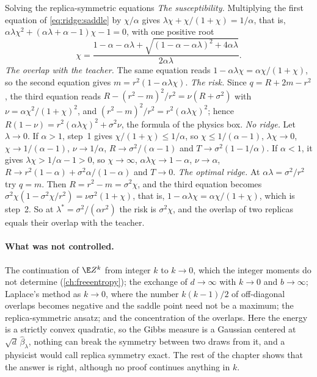 \begin{refsection}
\begin{computation}{Solving the replica-symmetric equations}\label{comp:ridge:saddle}
\step \emph{The susceptibility.} Multiplying the first equation of \eqref{eq:ridge:saddle} by $\chi/\alpha$ gives $\lambda\chi+\chi/(1+\chi)=1/\alpha$, that is, $\alpha\lambda\chi^2+(\alpha\lambda+\alpha-1)\chi-1=0$, with one positive root
\[
\chi=\frac{1-\alpha-\alpha\lambda+\sqrt{(1-\alpha-\alpha\lambda)^2+4\alpha\lambda}}{2\alpha\lambda}.
\]
\step \emph{The overlap with the teacher.} The same equation reads $1-\alpha\lambda\chi=\alpha\chi/(1+\chi)$, so the second equation gives $m=r^2(1-\alpha\lambda\chi)$.
\step \emph{The risk.} Since $q=R+2m-r^2$, the third equation reads $R-(r^2-m)^2/r^2=\nu(R+\sigma^2)$ with $\nu=\alpha\chi^2/(1+\chi)^2$, and $(r^2-m)^2/r^2=r^2(\alpha\lambda\chi)^2$; hence $R(1-\nu)=r^2(\alpha\lambda\chi)^2+\sigma^2\nu$, the formula of the physics box.
\step \emph{No ridge.} Let $\lambda\to0$. If $\alpha>1$, step~1 gives $\chi/(1+\chi)\le1/\alpha$, so $\chi\le1/(\alpha-1)$, $\lambda\chi\to0$, $\chi\to1/(\alpha-1)$, $\nu\to1/\alpha$, $R\to\sigma^2/(\alpha-1)$ and $T\to\sigma^2(1-1/\alpha)$. If $\alpha<1$, it gives $\lambda\chi>1/\alpha-1>0$, so $\chi\to\infty$, $\alpha\lambda\chi\to1-\alpha$, $\nu\to\alpha$, $R\to r^2(1-\alpha)+\sigma^2\alpha/(1-\alpha)$ and $T\to0$.
\step \emph{The optimal ridge.} At $\alpha\lambda=\sigma^2/r^2$ try $q=m$. Then $R=r^2-m=\sigma^2\chi$, and the third equation becomes $\sigma^2\chi(1-\sigma^2\chi/r^2)=\nu\sigma^2(1+\chi)$, that is, $1-\alpha\lambda\chi=\alpha\chi/(1+\chi)$, which is step~2. So at $\lambda^*=\sigma^2/(\alpha r^2)$ the risk is $\sigma^2\chi$, and the overlap of two replicas equals their overlap with the teacher.
\end{computation}

\paragraph{What was not controlled.} The continuation of $\E Z^k$ from integer $k$ to $k\to0$, which the integer moments do not determine (\cref{ch:freeentropy}); the exchange of $d\to\infty$ with $k\to0$ and $b\to\infty$; Laplace's method as $k\to0$, where the number $k(k-1)/2$ of off-diagonal overlaps becomes negative and the saddle point need not be a maximum; the replica-symmetric ansatz; and the concentration of the overlaps. Here the energy is a strictly convex quadratic, so the Gibbs measure is a Gaussian centered at $\sqrt d\,\hat\beta_\lambda$, nothing can break the symmetry between two draws from it, and a physicist would call replica symmetry exact. The rest of the chapter shows that the answer is right, although no proof continues anything in $k$.


\end{refsection}
